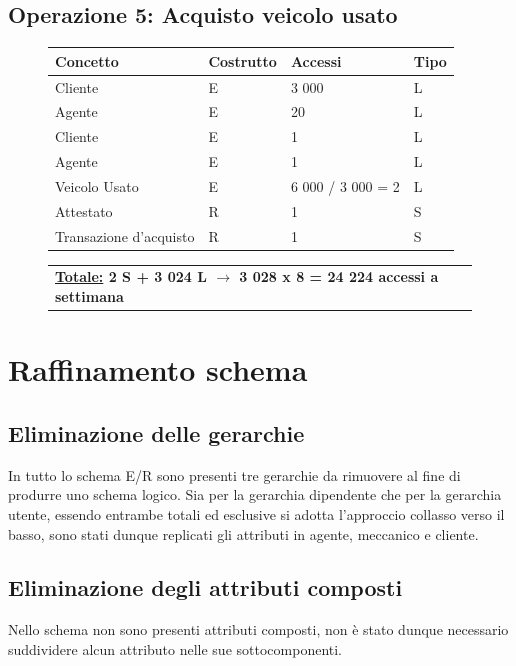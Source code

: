 \documentclass[a4paper,12pt]{report}
\begin{document}
\subsection*{Operazione 5: Acquisto veicolo usato}
\begin{figure}[ht]
	\centering
	\begin{tabular}{L{4.5cm}C{2cm}C{4.5cm}C{2cm}}
		\rule[-2mm]{0mm}{0.6cm}{}
		\textbf{Concetto} & \textbf{Costrutto} &\textbf{Accessi} & \textbf{Tipo} \\
		\hline\rule[-2mm]{0mm}{0.65cm}{}
		Cliente & E & 3 000 & L \\
		\hline\rule[-2mm]{0mm}{0.65cm}{}
		Agente & E & 20 & L \\
		\hline\rule[-2mm]{0mm}{0.65cm}{}
		Cliente & E & 1 & L \\
		\hline\rule[-2mm]{0mm}{0.65cm}{}
		Agente & E & 1 & L \\
		\hline\rule[-2mm]{0mm}{0.65cm}{}
		Veicolo Usato & E & 6 000 / 3 000 = 2 & L \\
		\hline\rule[-2mm]{0mm}{0.65cm}{}
		Attestato & R & 1 & S \\
		\hline\rule[-2mm]{0mm}{0.65cm}{}
		Transazione d'acquisto& R & 1 & S \\
	\end{tabular}
	
	\begin{tabular}{C{13.9cm}}
		\rule[-3mm]{0mm}{0.85cm}{}	
		 \textbf{\underline{Totale:} 2 S +  3 024 L $\to$ 3 028 x 8 = 24 224 accessi a settimana}
	\end{tabular}
\end{figure}

\section{Raffinamento schema}
\subsection*{Eliminazione delle gerarchie}
In tutto lo schema E/R sono presenti tre gerarchie da rimuovere al fine di produrre uno schema logico. 
%
Sia per la gerarchia dipendente che per la gerarchia utente, essendo entrambe totali ed esclusive si adotta l’approccio collasso 
%
verso il basso, sono stati dunque replicati gli attributi in agente, meccanico e cliente.

\subsection*{Eliminazione degli attributi composti }
Nello schema non sono presenti attributi composti, non è stato dunque necessario suddividere alcun attributo nelle sue sottocomponenti.
\end{document}
